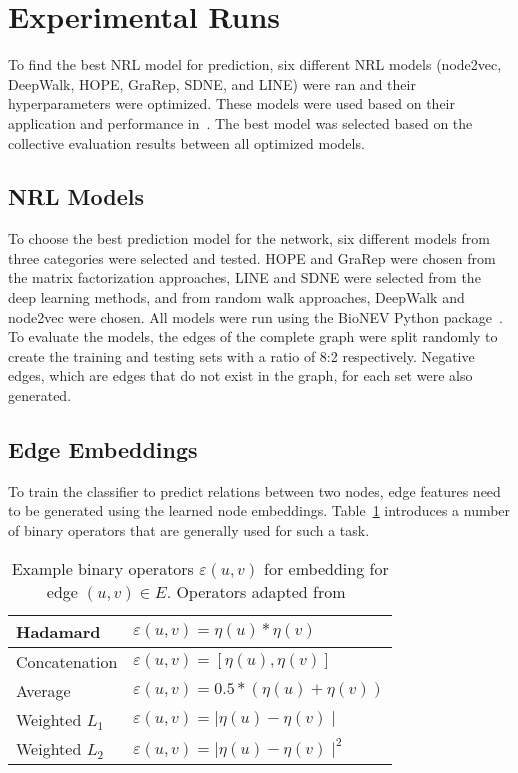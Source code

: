 \section{Experimental Runs}

To find the best \ac{NRL} model for prediction, six different \ac{NRL} models (node2vec, DeepWalk, \ac{HOPE}, \ac{GraRep}, \ac{SDNE}, and \ac{LINE}) were ran and their hyperparameters were optimized.
These models were used based on their application and performance in~\cite{yue_graph_2019}.
The best model was selected based on the collective evaluation results between all optimized models.

\subsection{\ac{NRL} Models}

To choose the best prediction model for the network, six different models from three categories were selected and tested.
\ac{HOPE} and \ac{GraRep} were chosen from the matrix factorization approaches, \ac{LINE} and \ac{SDNE} were selected from the deep learning methods, and from random walk approaches, DeepWalk and node2vec were chosen.
All models were run using the BioNEV Python package~\cite{yue_graph_2019}.
To evaluate the models, the edges of the complete graph were split randomly to create the training and testing sets with a ratio of 8:2 respectively.
Negative edges, which are edges that do not exist in the graph, for each set were also generated.

\subsection{Edge Embeddings}

To train the classifier to predict relations between two nodes, edge features need to be generated using the learned node embeddings.
Table~\ref{tab:operators} introduces a number of binary operators that are generally used for such a task.

\begin{table}[h!]
    \centering
    \begin{tabular}{ |l|l| }
        \hline
        Hadamard & $\varepsilon(u,v)= \eta(u)*\eta(v)$ \\
        \hline
        Concatenation & $\varepsilon(u,v)=[\eta(u), \eta(v)]$ \\
        \hline
        Average & $\varepsilon(u,v)=0.5*(\eta(u)+\eta(v))$ \\
        \hline
        Weighted $L_{1}$ & $\varepsilon(u,v)=\mid\eta(u)-\eta(v)\mid$ \\
        \hline
        Weighted $L_{2}$ & $\varepsilon(u,v)=\mid\eta(u)-\eta(v)\mid^2$ \\
        \hline
    \end{tabular}
    \caption[Example binary operators $\varepsilon(u,v)$ for embedding for edge $(u,v) \in E$]{Example binary operators $\varepsilon(u,v)$ for embedding for edge $(u,v) \in E$. Operators adapted from~\cite{grover_node2vec:_2016}}
    \label{tab:operators}
\end{table}


